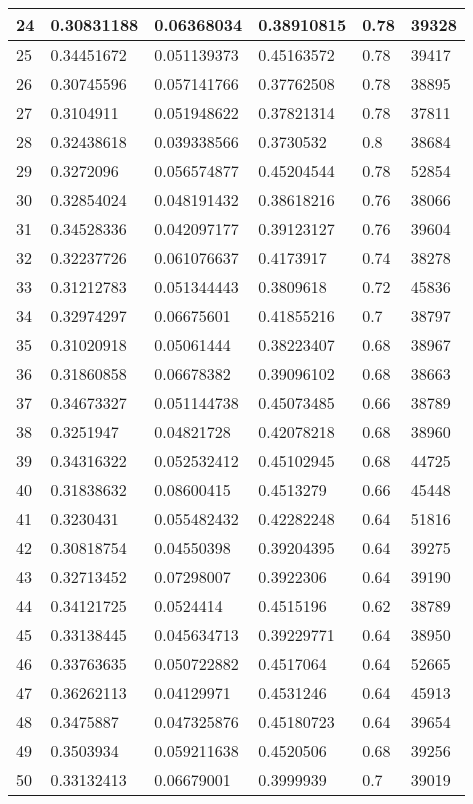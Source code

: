 \begin{longtable}{|l|l|l|l|l|l|}
24 & 0.30831188 & 0.06368034 & 0.38910815 & 0.78 & 39328 \\ \hline 
25 & 0.34451672 & 0.051139373 & 0.45163572 & 0.78 & 39417 \\ \hline 
26 & 0.30745596 & 0.057141766 & 0.37762508 & 0.78 & 38895 \\ \hline 
27 & 0.3104911 & 0.051948622 & 0.37821314 & 0.78 & 37811 \\ \hline 
28 & 0.32438618 & 0.039338566 & 0.3730532 & 0.8 & 38684 \\ \hline 
29 & 0.3272096 & 0.056574877 & 0.45204544 & 0.78 & 52854 \\ \hline 
30 & 0.32854024 & 0.048191432 & 0.38618216 & 0.76 & 38066 \\ \hline 
31 & 0.34528336 & 0.042097177 & 0.39123127 & 0.76 & 39604 \\ \hline 
32 & 0.32237726 & 0.061076637 & 0.4173917 & 0.74 & 38278 \\ \hline 
33 & 0.31212783 & 0.051344443 & 0.3809618 & 0.72 & 45836 \\ \hline 
34 & 0.32974297 & 0.06675601 & 0.41855216 & 0.7 & 38797 \\ \hline 
35 & 0.31020918 & 0.05061444 & 0.38223407 & 0.68 & 38967 \\ \hline 
36 & 0.31860858 & 0.06678382 & 0.39096102 & 0.68 & 38663 \\ \hline 
37 & 0.34673327 & 0.051144738 & 0.45073485 & 0.66 & 38789 \\ \hline 
38 & 0.3251947 & 0.04821728 & 0.42078218 & 0.68 & 38960 \\ \hline 
39 & 0.34316322 & 0.052532412 & 0.45102945 & 0.68 & 44725 \\ \hline 
40 & 0.31838632 & 0.08600415 & 0.4513279 & 0.66 & 45448 \\ \hline 
41 & 0.3230431 & 0.055482432 & 0.42282248 & 0.64 & 51816 \\ \hline 
42 & 0.30818754 & 0.04550398 & 0.39204395 & 0.64 & 39275 \\ \hline 
43 & 0.32713452 & 0.07298007 & 0.3922306 & 0.64 & 39190 \\ \hline 
44 & 0.34121725 & 0.0524414 & 0.4515196 & 0.62 & 38789 \\ \hline 
45 & 0.33138445 & 0.045634713 & 0.39229771 & 0.64 & 38950 \\ \hline 
46 & 0.33763635 & 0.050722882 & 0.4517064 & 0.64 & 52665 \\ \hline 
47 & 0.36262113 & 0.04129971 & 0.4531246 & 0.64 & 45913 \\ \hline 
48 & 0.3475887 & 0.047325876 & 0.45180723 & 0.64 & 39654 \\ \hline 
49 & 0.3503934 & 0.059211638 & 0.4520506 & 0.68 & 39256 \\ \hline 
50 & 0.33132413 & 0.06679001 & 0.3999939 & 0.7 & 39019 \\ \hline 
\end{longtable}